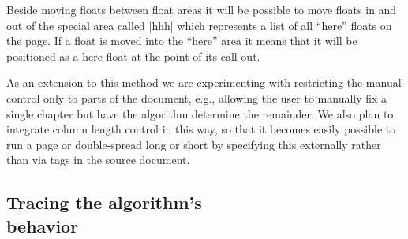 \documentclass[twocolumn]{article}
\begin{document}
Beside moving floats between float areas it will be possible to move
floats in and out of the special area called |hhh| which represents a
list of all ``here'' floats on the page. If a float is moved into the
``here'' area it means that it will be positioned as a here float at
the point of its call-out.


As an extension to this method we are experimenting with restricting
the manual control only to parts of the document, e.g., allowing the
user to manually fix a single chapter but have the algorithm determine
the remainder. We also plan to integrate column length control in this
way, so that it becomes easily possible to run a page or double-spread
long or short by specifying this externally rather than via tags in
the source document.



\subsection[Tracing the algorithm's behavior]
           {Tracing the algorithm's\\ behavior}
\end{document}
